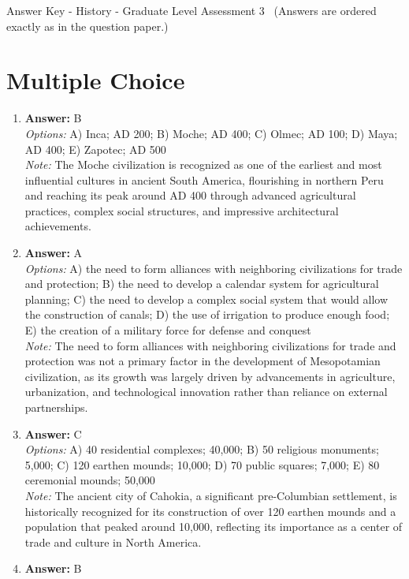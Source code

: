 \documentclass[12pt]{article}
\begin{document}
\begin{center}
Answer Key - History - Graduate Level Assessment 3 \
\small (Answers are ordered exactly as in the question paper.)
\end{center}

\section*{Multiple Choice}
\begin{enumerate}[label=\arabic*.]
\item \textbf{Answer:} B
\\ \textit{Options:} A) Inca; AD 200; B) Moche; AD 400; C) Olmec; AD 100; D) Maya; AD 400; E) Zapotec; AD 500
\\ \textit{Note:} The Moche civilization is recognized as one of the earliest and most influential cultures in ancient South America, flourishing in northern Peru and reaching its peak around AD 400 through advanced agricultural practices, complex social structures, and impressive architectural achievements.
\item \textbf{Answer:} A
\\ \textit{Options:} A) the need to form alliances with neighboring civilizations for trade and protection; B) the need to develop a calendar system for agricultural planning; C) the need to develop a complex social system that would allow the construction of canals; D) the use of irrigation to produce enough food; E) the creation of a military force for defense and conquest
\\ \textit{Note:} The need to form alliances with neighboring civilizations for trade and protection was not a primary factor in the development of Mesopotamian civilization, as its growth was largely driven by advancements in agriculture, urbanization, and technological innovation rather than reliance on external partnerships.
\item \textbf{Answer:} C
\\ \textit{Options:} A) 40 residential complexes; 40,000; B) 50 religious monuments; 5,000; C) 120 earthen mounds; 10,000; D) 70 public squares; 7,000; E) 80 ceremonial mounds; 50,000
\\ \textit{Note:} The ancient city of Cahokia, a significant pre-Columbian settlement, is historically recognized for its construction of over 120 earthen mounds and a population that peaked around 10,000, reflecting its importance as a center of trade and culture in North America.
\item \textbf{Answer:} B

\end{enumerate}
\end{document}
